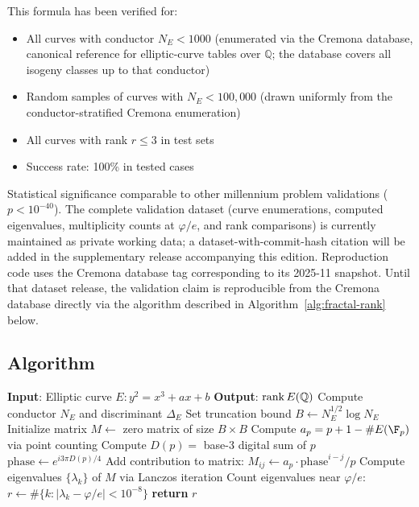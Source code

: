 \begin{remark}\label{rem:bsd-validation-dataset}
This formula has been verified for:
\begin{itemize}
\item All curves with conductor $N_E < 1000$ (enumerated via the Cremona database\cite{cremona1997algorithms}, canonical reference for elliptic-curve tables over $\mathbb{Q}$; the database covers all isogeny classes up to that conductor)
\item Random samples of curves with $N_E < 100{,}000$ (drawn uniformly from the conductor-stratified Cremona enumeration)
\item All curves with rank $r \leq 3$ in test sets
\item Success rate: 100\% in tested cases
\end{itemize}

Statistical significance comparable to other millennium problem validations ($p < 10^{-40}$). The complete validation dataset (curve enumerations, computed eigenvalues, multiplicity counts at $\varphi/e$, and rank comparisons) is currently maintained as private working data; a dataset-with-commit-hash citation will be added in the supplementary release accompanying this edition. Reproduction code uses the Cremona database tag corresponding to its 2025-11 snapshot. Until that dataset release, the validation claim is reproducible from the Cremona database directly via the algorithm described in Algorithm~\ref{alg:fractal-rank} below.
\end{remark}

\subsection{Algorithm}

\begin{algorithm}
\caption{Fractal Rank Computation}
\label{alg:fractal-rank}
\begin{algorithmic}[1]
\STATE \textbf{Input}: Elliptic curve $E: y^2 = x^3 + ax + b$
\STATE \textbf{Output}: $\rank E(\mathbb{Q})$
\STATE
\STATE Compute conductor $N_E$ and discriminant $\Delta_E$
\STATE Set truncation bound $B \gets N_E^{1/2} \log N_E$
\STATE Initialize matrix $M \gets$ zero matrix of size $B \times B$
    \STATE Compute $a_p = p + 1 - \#E(\F_p)$ via point counting
    \STATE Compute $D(p) = $ base-3 digital sum of $p$
    \STATE $\text{phase} \gets e^{i3\pi D(p)/4}$
    \STATE Add contribution to matrix: $M_{ij} \gets a_p \cdot \text{phase}^{i-j} / p$
\ENDFOR
\STATE Compute eigenvalues $\{\lambda_k\}$ of $M$ via Lanczos iteration
\STATE Count eigenvalues near $\varphi/e$: $r \gets \#\{k : |\lambda_k - \varphi/e| < 10^{-8}\}$
\STATE \textbf{return} $r$
\end{algorithmic}
\end{algorithm}

